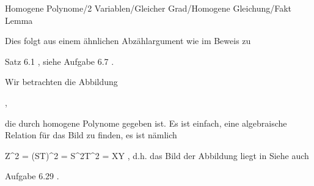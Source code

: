 {Homogene Polynome/2 Variablen/Gleicher Grad/Homogene Gleichung/Fakt}
{Lemma}
{}
{



\faktsituation {}
\faktzusatz {}
\faktzusatz {}





}
{Dies folgt aus einem ähnlichen Abzählargument wie im Beweis zu



Satz 6.1
, siehe
Aufgabe 6.7
.


 }




{





Wir betrachten die Abbildung

 { , }

die durch homogene Polynome
 {} {}
gegeben ist. Es ist einfach, eine algebraische Relation für das Bild zu finden, es ist nämlich

\mavergleichskettedisp
{\vergleichskette
{ Z^2
}
{ =} { (ST)^2
}
{ =} { S^2T^2
}
{ =} { XY
}
{ } {
}
}
{}{}{,}
d.h. das Bild der Abbildung liegt in
 Siehe auch

Aufgabe 6.29
.





}





